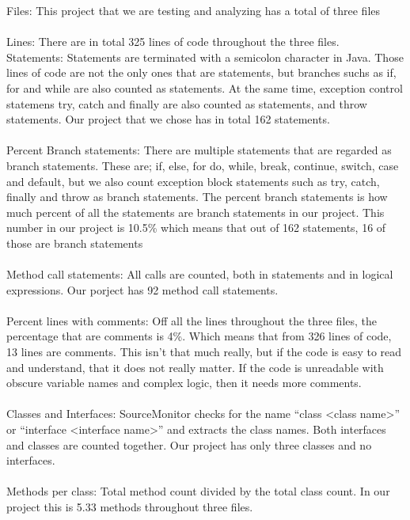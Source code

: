 \documentclass[UKenglish]{article}  %
\begin{document}
 

Files: This project that we are testing and analyzing has a total of three files\\\\
Lines: There are in total 325 lines of code throughout the three files. \\
Statements: Statements are terminated with a semicolon character in Java. Those lines of code are not the only ones that are statements, but branches suchs as if, for and while are also counted as statements. At the same time, exception control statemens try, catch and finally are also counted as statements, and throw statements. Our project that we chose has in total 162 statements. \\\\
Percent Branch statements: There are multiple statements that are regarded as branch statements. These are; if, else, for do, while, break, continue, switch, case and default, but we also count exception block statements such as try, catch, finally and throw as branch statements. The percent branch statements is how much percent of all the statements are branch statements in our project. This number in our project is 10.5\% which means that out of 162 statements, 16 of those are branch statements\\\\
Method call statements: All calls are counted, both in statements and in logical expressions. Our porject has 92 method call statements.\\\\
Percent lines with comments: Off all the lines throughout the three files, the percentage that are comments is 4\%. Which means that from 326 lines of code, 13 lines are comments. This isn't that much really, but if the code is easy to read and understand, that it does not really matter. If the code is unreadable with obscure variable names and complex logic, then it needs more comments. \\\\
Classes and Interfaces: SourceMonitor checks for the name ``class <class name>'' or ``interface <interface name>'' and extracts the class names. Both interfaces and classes are counted together. Our project has only three classes and no interfaces. \\\\ 
Methods per class: Total method count divided by the total class count. In our project this is 5.33 methods throughout three files. \\\\
\end{document}
